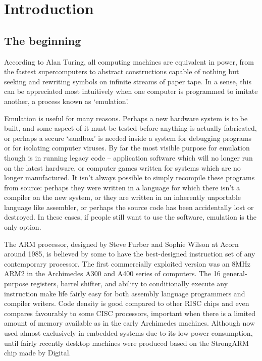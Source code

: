 \chapter{Introduction}

\section{The beginning}

According to Alan Turing, all computing machines are equivalent in power, from the fastest supercomputers to abstract constructions capable of nothing but seeking and rewriting symbols on infinite streams of paper tape. In a sense, this can be appreciated most intuitively when one computer is programmed to imitate another, a process known as `emulation'.

Emulation is useful for many reasons. Perhaps a new hardware system is to be built, and some aspect of it must be tested before anything is actually fabricated, or perhaps a secure `sandbox' is needed inside a system for debugging programs or for isolating computer viruses. By far the most visible purpose for emulation though is in running legacy code -- application software which will no longer run on the latest hardware, or computer games written for systems which are no longer manufactured. It isn't always possible to simply recompile these programs from source: perhaps they were written in a language for which there isn't a compiler on the new system, or they are written in an inherently unportable language like assembler, or perhaps the source code has been accidentally lost or destroyed. In these cases, if people still want to use the software, emulation is the only option.

The ARM processor, designed by Steve Furber and Sophie Wilson at Acorn around 1985, is believed by some to have the best-designed instruction set of any contemporary processor. The first commercially exploited version was an 8MHz ARM2 in the Archimedes A300 and A400 series of computers. The 16 general-purpose registers, barrel shifter, and ability to conditionally execute any instruction make life fairly easy for both assembly language programmers and compiler writers. Code density is good compared to other RISC chips and even compares favourably to some CISC processors, important when there is a limited amount of memory available as in the early Archimedes machines. Although now used almost exclusively in embedded systems due to its low power consumption, until fairly recently desktop machines were produced based on the StrongARM chip made by Digital.


